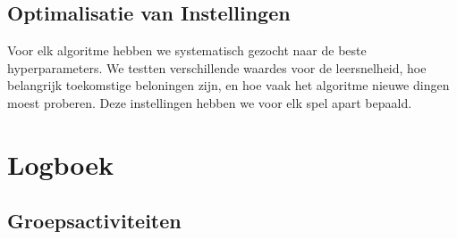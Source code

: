\documentclass[a4paper,11pt]{report}-
\begin{document}
\section{Optimalisatie van Instellingen}
Voor elk algoritme hebben we systematisch gezocht naar de beste
hyperparameters. We testten verschillende waardes voor de leersnelheid, hoe
belangrijk toekomstige beloningen zijn, en hoe vaak het algoritme nieuwe dingen
moest proberen. Deze instellingen hebben we voor elk spel apart bepaald.

\chapter{Logboek}
\small
\section*{Groepsactiviteiten}
\end{document}
